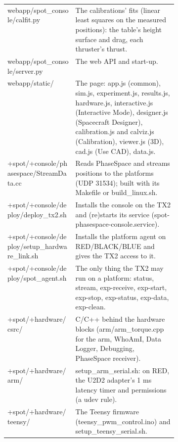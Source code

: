 \documentclass[11pt,a4paper]{article}
\begin{document}
\begin{xltabular}{\linewidth}{@{}>{\raggedright\arraybackslash\ttfamily\footnotesize}p{0.40\linewidth} >{\raggedright\arraybackslash\small}X@{}}
webapp/\allowbreak{}spot\_console/\allowbreak{}calfit.py & The calibrations' fits (linear least squares on the measured positions): the table's height surface and drag, each thruster's thrust. \\
webapp/\allowbreak{}spot\_console/\allowbreak{}server.py & The web API and start-up. \\
webapp/\allowbreak{}static/\allowbreak{} & The page: app.js (common), sim.js, experiment.js, results.js, hardware.js, interactive.js (Interactive Mode), designer.js (Spacecraft Designer), calibration.js and calviz.js (Calibration), viewer.js (3D), cad.js (Use CAD), data.js. \\
+spot/\allowbreak{}+console/\allowbreak{}phasespace/\allowbreak{}StreamData.cc & Reads PhaseSpace and streams positions to the platforms (UDP 31534); built with its Makefile or build\_linux.sh. \\
+spot/\allowbreak{}+console/\allowbreak{}deploy/\allowbreak{}deploy\_tx2.sh & Installs the console on the TX2 and (re)starts its service (spot-phasespace-console.service). \\
+spot/\allowbreak{}+console/\allowbreak{}deploy/\allowbreak{}setup\_hardware\_link.sh & Installs the platform agent on RED/BLACK/BLUE and gives the TX2 access to it. \\
+spot/\allowbreak{}+console/\allowbreak{}deploy/\allowbreak{}spot\_agent.sh & The only thing the TX2 may run on a platform: status, stream, exp-receive, exp-start, exp-stop, exp-status, exp-data, exp-clean. \\
+spot/\allowbreak{}+hardware/\allowbreak{}csrc/\allowbreak{} & C/C++ behind the hardware blocks (arm/arm\_torque.cpp for the arm, WhoAmI, Data Logger, Debugging, PhaseSpace receiver). \\
+spot/\allowbreak{}+hardware/\allowbreak{}arm/\allowbreak{} & setup\_arm\_serial.sh: on RED, the U2D2 adapter's 1 ms latency timer and permissions (a udev rule). \\
+spot/\allowbreak{}+hardware/\allowbreak{}teensy/\allowbreak{} & The Teensy firmware (teensy\_pwm\_control.ino) and setup\_teensy\_serial.sh. \\
\bottomrule\end{xltabular}
\end{document}
